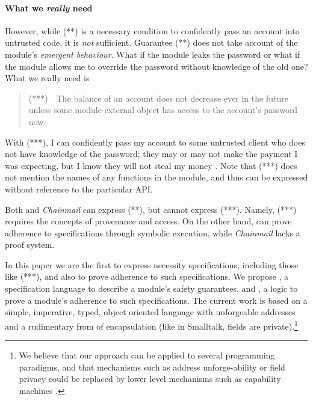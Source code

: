  
\susan[font?]{}\paragraph{What we \emph{really} need} However, while (**) is a necessary condition  to confidently pass 
 an account into untrusted code, it is \emph{not} sufficient.
Guarantee (**) does not take  account of the module's \emph{emergent behaviour}.
 What if the module leaks the password or what if the module allows me to override the
 password without knowledge of the old one? 
 What we really need is
 \begin{quote}
(***)\  \ The balance of an account does not decrease ever in the future unless some module-external 
object has access to the account's password now.
\end{quote}
With (***), I can confidently pass my account to some untrusted client who
  does not have
 knowledge of the password; they may or may not make the payment I was expecting, but I
 know they will not steal my money \cite{ooToSecurity,miller-esop2013}.
 Note that (***)  does not mention
 the names of any functions in the module, and 
 thus can be expressed without reference to the particular API. 
 

  Both {} and  \emph{Chainmail} can express (**), but {}  cannot express (***). 
  Namely, (***)  requires the concepts of provenance and access.
 On the other hand, {} can prove adherence to  specifications through symbolic 
  execution, while  \emph{Chainmail}   lacks a proof system. 
  
\vspace{.06in}

In this paper we are  the first to express necessity specifications, including those like (***), and 
also to prove adherence to such specifications.
We propose \Chainmail, a specification language %
 to describe a module's safety guarantees,
and 
\Chainlogic,   %
a logic to prove a module's adherence to such specifications.
The current work is based on a simple, imperative, typed, object oriented
language with unforgeable addresses and a rudimentary
from of encapsulation (like in Smalltalk, fields are private).\footnote{We believe
 that our approach can be applied to several programming paradigms, and 
 that mechanisms such as address unforge-ability or field privacy
 could be replaced 
 by lower level mechanisms such as capability machines \cite{vanproving,davis2019cheriabi}.
  }


